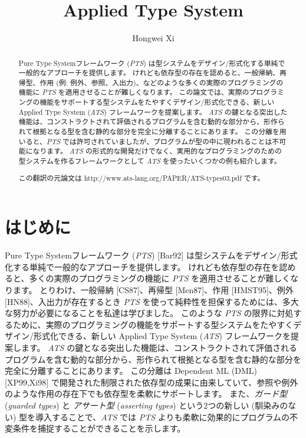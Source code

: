 \documentclass[submit,techreq,noauthor,onecolumn]{ipsj}
\begin{document}
\title{Applied Type System}

\author{Hongwei Xi}{}{}

\begin{abstract}
Pure Type Systemフレームワーク ({\it PTS}) は型システムをデザイン/形式化する単純で一般的なアプローチを提供します。
けれども依存型の存在を認めると、一般帰納、再帰型、作用 (例: 例外、参照、入出力)、などのような多くの実際のプログラミングの機能に {\it PTS} を適用させることが難しくなります。
この論文では、実際のプログラミングの機能をサポートする型システムをたやすくデザイン/形式化できる、新しい Applied Type System ({\it ATS}) フレームワークを提案します。
{\it ATS} の鍵となる突出した機能は、コンストラクトされて評価されるプログラムを含む動的な部分から、形作られて根拠となる型を含む静的な部分を完全に分離することにあります。
この分離を用いると、{\it PTS} では許可されていましたが、プログラムが型の中に現われることは不可能になります。
{\it ATS} の形式的な開発だけでなく、実用的なプログラミングのための型システムを作るフレームワークとして {\it ATS} を使ったいくつかの例も紹介します。

この翻訳の元論文は http://www.ats-lang.org/PAPER/ATS-types03.pdf です。
\end{abstract}

\maketitle
\thispagestyle{empty}

\section{はじめに}

Pure Type Systemフレームワーク ({\it PTS}) [Bar92] は型システムをデザイン/形式化する単純で一般的なアプローチを提供します。
けれども依存型の存在を認めると、多くの実際のプログラミングの機能に {\it PTS} を適用させることが難しくなります。
とりわけ、一般帰納 [CS87]、再帰型 [Men87]、作用 [HMST95]、例外 [HN88]、入出力が存在するとき {\it PTS} を使って純粋性を担保するためには、多大な努力が必要になることを私達は学びました。
このような {\it PTS} の限界に対処するために、実際のプログラミングの機能をサポートする型システムをたやすくデザイン/形式化できる、新しい Applied Type System ({\it ATS}) フレームワークを提案します。
{\it ATS} の鍵となる突出した機能は、コンストラクトされて評価されるプログラムを含む動的な部分から、形作られて根拠となる型を含む静的な部分を完全に分離することにあります。
この分離は Dependent ML (DML) [XP99,Xi98] で開発された制限された依存型の成果に由来していて、参照や例外のような作用の存在下でも依存型を柔軟にサポートします。
また、{\it ガード型} ({\it guarded types}) と {\it アサート型} ({\it asserting types}) という2つの新しい (馴染みのない) 型を導入することで、{\it ATS} では {\it PTS} よりも柔軟に効果的にプログラムの不変条件を捕捉することができることを示します。
\end{document}
